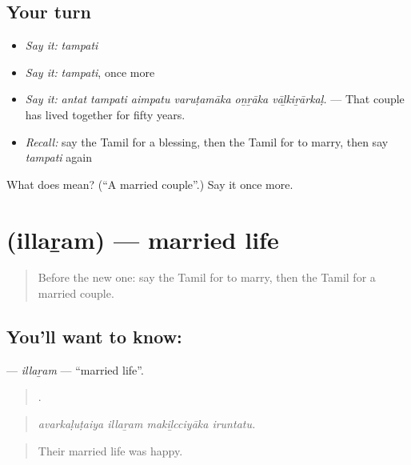 \subsection*{Your turn}
\begin{itemize}
\raggedright
  \item \emph{Say it:} \emph{tampati}
  \item \emph{Say it:} \emph{tampati}, once more
  \item \emph{Say it:} \emph{antat tampati aimpatu varuṭamāka oṉṟāka vāḻkiṟārkaḷ.} — That couple has lived together for fifty years.
  \item \emph{Recall:} say the Tamil for a blessing, then the Tamil for to marry, then say \emph{tampati} again
\end{itemize}

\begin{tcolorbox}[breakable,colback=teal!4,colframe=teal!35!black,title={Before you move on}]
What does  mean? (\textquotedblleft{}A married couple\textquotedblright{}.) Say it once more.
\end{tcolorbox}
\section[\texorpdfstring{\ta{இல்லறம்} (illaṟam)}{இல்லறம் (illaṟam)}]{ (illaṟam) — married life}

\label{lesson:TA-C499-illaram}



\begin{quote}
Before the new one: say the Tamil for to marry, then the Tamil for a married couple.
\end{quote}

\subsection*{You'll want to know: }
\textbf{} — \emph{illaṟam} — \textquotedblleft{}married life\textquotedblright{}.

\begin{quote}
   .
\end{quote}

\begin{quote}
\emph{avarkaḷuṭaiya illaṟam makiḻcciyāka iruntatu.}
\end{quote}

\begin{quote}
Their married life was happy.
\end{quote}

